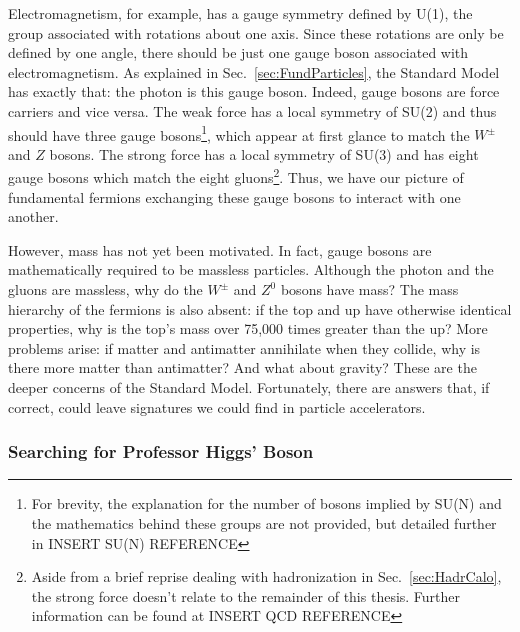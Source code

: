 Electromagnetism, for example, has a gauge symmetry defined by U(1), the group associated with rotations about one axis. Since these rotations are only be defined by one angle, there should be just one gauge boson associated with electromagnetism. As explained in Sec.~\ref{sec:FundParticles}, the Standard Model has exactly that: the photon is this gauge boson. Indeed, gauge bosons are force carriers and vice versa. The weak force has a local symmetry of SU(2) and thus should have three gauge bosons\footnote{For brevity, the explanation for the number of bosons implied by SU(N) and the mathematics behind these groups are not provided, but detailed further in INSERT SU(N) REFERENCE}, which appear at first glance to match the $W^{\pm}$ and $Z$ bosons. The strong force has a local symmetry of SU(3) and has eight gauge bosons which match the eight gluons\footnote{Aside from a brief reprise dealing with hadronization in Sec.~\ref{sec:HadrCalo}, the strong force doesn't relate to the remainder of this thesis. Further information can be found at INSERT QCD REFERENCE}. Thus, we have our picture of fundamental fermions exchanging these gauge bosons to interact with one another.

However, mass has not yet been motivated. In fact, gauge bosons are mathematically required to be massless particles. Although the photon and the gluons are massless, why do the $W^{\pm}$ and $Z^{0}$ bosons have mass? The mass hierarchy of the fermions is also absent: if the top and up have otherwise identical properties, why is the top's mass over 75,000 times greater than the up? More problems arise: if matter and antimatter annihilate when they collide, why is there more matter than antimatter? And what about gravity? These are the deeper concerns of the Standard Model. Fortunately, there are answers that, if correct, could leave signatures we could find in particle accelerators.

\subsubsection{Searching for Professor Higgs' Boson}
\label{sec:findinghiggs}


